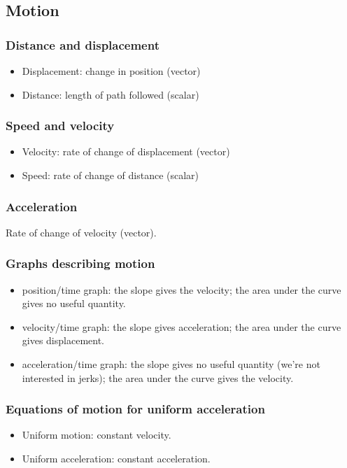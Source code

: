 \subsection{Motion}

\subsubsection{Distance and displacement}
\begin{itemize}
    \item Displacement: change in position (vector)
    \item Distance: length of path followed (scalar)
\end{itemize}

\subsubsection{Speed and velocity}
\begin{itemize}
    \item Velocity: rate of change of displacement (vector)
    \item Speed: rate of change of distance (scalar)
\end{itemize}

\subsubsection{Acceleration}
Rate of change of velocity (vector).

\subsubsection{Graphs describing motion}
\begin{itemize}
    \item position/time graph: the slope gives the velocity; the area under
        the curve gives no useful quantity.
    \item velocity/time graph: the slope gives acceleration; the area under
        the curve gives displacement.
    \item acceleration/time graph: the slope gives no useful quantity (we're
        not interested in jerks); the area under the curve gives the velocity.
\end{itemize}

\subsubsection{Equations of motion for uniform acceleration}
\begin{itemize}
    \item Uniform motion: constant velocity.
    \item Uniform acceleration: constant acceleration.
\end{itemize}

